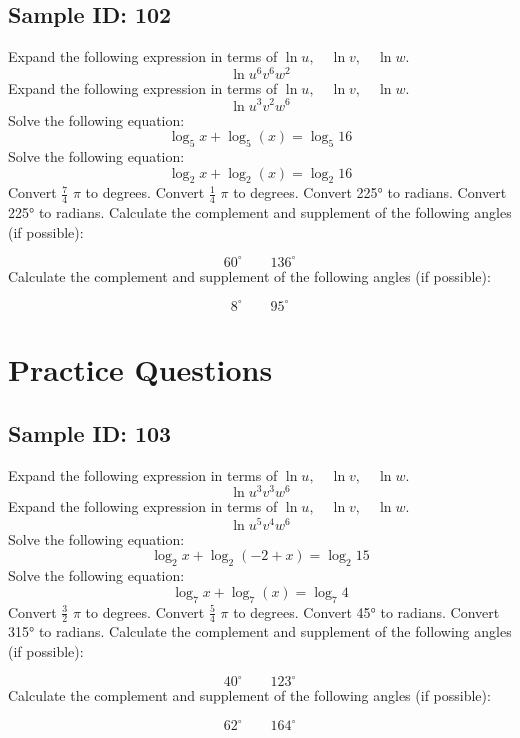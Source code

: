 \documentclass{exam}
\begin{document}
\subsection*{Sample ID: 102}
\begin{questions}
\question Expand the following expression in terms of $\ln u,\quad \ln v,\quad  \ln w$. \[\ln u^{6}v^{6}w^{2}\] 
\question Expand the following expression in terms of $\ln u,\quad \ln v,\quad  \ln w$. \[\ln u^{3}v^{2}w^{6}\] 
\question Solve the following equation: 
 \[\log_{5}{x}+\log_{5}{\left(x\right)}=\log_{5}{16}\]
\question Solve the following equation: 
 \[\log_{2}{x}+\log_{2}{\left(x\right)}=\log_{2}{16}\]
\newpage
\question Convert $\frac{7}{4}$ $\pi$   to degrees.
\question Convert $\frac{1}{4}$ $\pi$   to degrees.
\question Convert 225° to radians.
\question Convert 225° to radians.
\question Calculate the complement and supplement of the following angles (if possible):
 
                  \[60^{\circ}\quad\quad 136^{\circ}\]\question Calculate the complement and supplement of the following angles (if possible):
 
                  \[8^{\circ}\quad\quad 95^{\circ}\]\end{questions}\newpage
\section*{Practice Questions}
\subsection*{Sample ID: 103}
\begin{questions}
\question Expand the following expression in terms of $\ln u,\quad \ln v,\quad  \ln w$. \[\ln u^{3}v^{3}w^{6}\] 
\question Expand the following expression in terms of $\ln u,\quad \ln v,\quad  \ln w$. \[\ln u^{5}v^{4}w^{6}\] 
\question Solve the following equation: 
 \[\log_{2}{x}+\log_{2}{\left(-2 + x\right)}=\log_{2}{15}\]
\question Solve the following equation: 
 \[\log_{7}{x}+\log_{7}{\left(x\right)}=\log_{7}{4}\]
\newpage
\question Convert $\frac{3}{2}$ $\pi$   to degrees.
\question Convert $\frac{5}{4}$ $\pi$   to degrees.
\question Convert 45° to radians.
\question Convert 315° to radians.
\question Calculate the complement and supplement of the following angles (if possible):
 
                  \[40^{\circ}\quad\quad 123^{\circ}\]\question Calculate the complement and supplement of the following angles (if possible):
 
                  \[62^{\circ}\quad\quad 164^{\circ}\]\end{questions}\newpage
\end{document}
